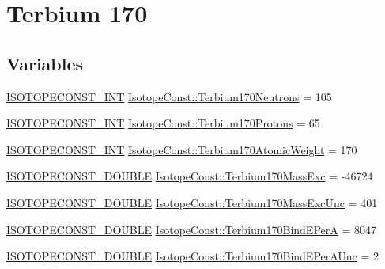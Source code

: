 \hypertarget{group___isotope_const-_terbium-_tb170}{}\section{Terbium 170}
\label{group___isotope_const-_terbium-_tb170}
\subsection*{Variables}
\begin{DoxyCompactItemize}
\item 
\mbox{\hyperlink{group___isotope_const-_macros_ga5f18360b3e99483a35c32d789e62621c}{I\+S\+O\+T\+O\+P\+E\+C\+O\+N\+S\+T\+\_\+\+I\+NT}} \mbox{\hyperlink{group___isotope_const-_terbium-_tb170_ga8d007a3ebad56eba4ee2b4f93ea122b0}{Isotope\+Const\+::\+Terbium170\+Neutrons}} = 105
\item 
\mbox{\hyperlink{group___isotope_const-_macros_ga5f18360b3e99483a35c32d789e62621c}{I\+S\+O\+T\+O\+P\+E\+C\+O\+N\+S\+T\+\_\+\+I\+NT}} \mbox{\hyperlink{group___isotope_const-_terbium-_tb170_gacc3b7eba7259ac7c141a8a41aa20862b}{Isotope\+Const\+::\+Terbium170\+Protons}} = 65
\item 
\mbox{\hyperlink{group___isotope_const-_macros_ga5f18360b3e99483a35c32d789e62621c}{I\+S\+O\+T\+O\+P\+E\+C\+O\+N\+S\+T\+\_\+\+I\+NT}} \mbox{\hyperlink{group___isotope_const-_terbium-_tb170_ga8bfcb5c776fce1787fa6aab8d7a8e0fe}{Isotope\+Const\+::\+Terbium170\+Atomic\+Weight}} = 170
\item 
\mbox{\hyperlink{group___isotope_const-_macros_ga8f45a7272ce02c0b4c65c44636ed719a}{I\+S\+O\+T\+O\+P\+E\+C\+O\+N\+S\+T\+\_\+\+D\+O\+U\+B\+LE}} \mbox{\hyperlink{group___isotope_const-_terbium-_tb170_gadc5d038511bfd174f0525aa5934de6cb}{Isotope\+Const\+::\+Terbium170\+Mass\+Exc}} = -\/46724
\item 
\mbox{\hyperlink{group___isotope_const-_macros_ga8f45a7272ce02c0b4c65c44636ed719a}{I\+S\+O\+T\+O\+P\+E\+C\+O\+N\+S\+T\+\_\+\+D\+O\+U\+B\+LE}} \mbox{\hyperlink{group___isotope_const-_terbium-_tb170_gaf90e070aac6908dab670a94d13917d67}{Isotope\+Const\+::\+Terbium170\+Mass\+Exc\+Unc}} = 401
\item 
\mbox{\hyperlink{group___isotope_const-_macros_ga8f45a7272ce02c0b4c65c44636ed719a}{I\+S\+O\+T\+O\+P\+E\+C\+O\+N\+S\+T\+\_\+\+D\+O\+U\+B\+LE}} \mbox{\hyperlink{group___isotope_const-_terbium-_tb170_ga739fb79e872b78fd2694454d3f1cc518}{Isotope\+Const\+::\+Terbium170\+Bind\+E\+PerA}} = 8047
\item 
\mbox{\hyperlink{group___isotope_const-_macros_ga8f45a7272ce02c0b4c65c44636ed719a}{I\+S\+O\+T\+O\+P\+E\+C\+O\+N\+S\+T\+\_\+\+D\+O\+U\+B\+LE}} \mbox{\hyperlink{group___isotope_const-_terbium-_tb170_ga3deb63fd50cadce0e39ef64365b41a3e}{Isotope\+Const\+::\+Terbium170\+Bind\+E\+Per\+A\+Unc}} = 2

\end{DoxyCompactItemize}
